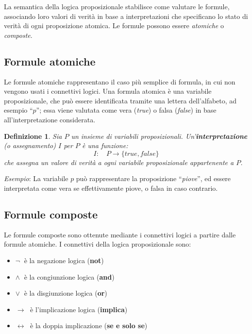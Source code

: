 \documentclass[a4paper,12pt]{report}
\newcommand{\tto} {\leftrightarrow}
\newtheorem{definition}{Definizione}[section]
\begin{document}
La semantica della logica proposizionale stabilisce come valutare le formule, associando loro valori di verità in base a interpretazioni che specificano lo stato di verità di ogni proposizione atomica. Le formule possono essere \emph{atomiche} o \emph{composte}.

\subsection{Formule atomiche}
Le formule atomiche rappresentano il caso più semplice di formula, in cui non vengono usati i connettivi logici. Una formula atomica è una variabile proposizionale, che può essere identificata tramite una lettera dell'alfabeto, ad esempio ``$p$''; essa viene valutata come vera (\emph{true}) o falsa (\emph{false}) in base all'interpretazione considerata.

\begin{definition}
    Sia $P$ un insieme di variabili proposizionali. Un'\textbf{interpretazione} (o assegnamento) $I$ per $P$ è una funzione:
    \[
        I: \quad P \to \{true, false\}
    \]
    che assegna un valore di verità a ogni variabile proposizionale appartenente a $P$.
\end{definition}

\emph{Esempio}: La variabile $p$ può rappresentare la proposizione ``\emph{piove}'', ed essere interpretata come vera se effettivamente piove, o falsa in caso contrario.

\subsection{Formule composte}
Le formule composte sono ottenute mediante i connettivi logici a partire dalle formule atomiche. I connettivi della logica proposizionale sono:
\begin{itemize}
    \item $\lnot \;$ è la negazione logica (\textbf{not})
    \item $\land \;$ è la congiunzione logica (\textbf{and})
    \item $\lor \;$ è la disgiunzione logica (\textbf{or})
    \item $\to\;$ è l'implicazione logica (\textbf{implica})
    \item $\tto\;$ è la doppia implicazione (\textbf{se e solo se})
\end{itemize}
\end{document}
